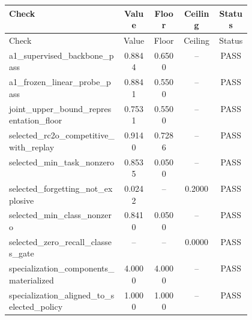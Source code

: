 \begin{longtable}{p{0.47\linewidth}cccc}
\toprule
Check & Value & Floor & Ceiling & Status \\
\midrule
\endfirsthead
\toprule
Check & Value & Floor & Ceiling & Status \\
\midrule
\endhead
a1\_supervised\_backbone\_pass & 0.8844 & 0.6500 & -- & PASS \\
a1\_frozen\_linear\_probe\_pass & 0.8841 & 0.5500 & -- & PASS \\
joint\_upper\_bound\_representation\_floor & 0.7531 & 0.5500 & -- & PASS \\
selected\_rc2o\_competitive\_with\_replay & 0.9140 & 0.7286 & -- & PASS \\
selected\_min\_task\_nonzero & 0.8535 & 0.0500 & -- & PASS \\
selected\_forgetting\_not\_explosive & 0.0242 & -- & 0.2000 & PASS \\
selected\_min\_class\_nonzero & 0.8410 & 0.0500 & -- & PASS \\
selected\_zero\_recall\_classes\_gate & -- & -- & 0.0000 & PASS \\
specialization\_components\_materialized & 4.0000 & 4.0000 & -- & PASS \\
specialization\_aligned\_to\_selected\_policy & 1.0000 & 1.0000 & -- & PASS \\
\bottomrule
\end{longtable}